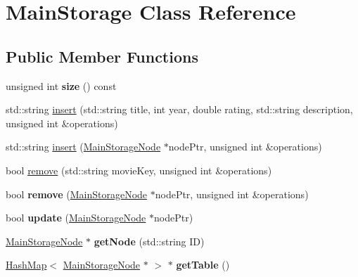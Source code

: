 \hypertarget{class_main_storage}{}\section{Main\+Storage Class Reference}
\label{class_main_storage}
\subsection*{Public Member Functions}
\begin{DoxyCompactItemize}
\item 
\mbox{\label{class_main_storage_a6221cec0fe744dbf127986da7cb31bb3}} 
unsigned int {\bfseries size} () const
\item 
std\+::string \hyperlink{class_main_storage_a96509520e0e92707d8970fb6dbcce111}{insert} (std\+::string title, int year, double rating, std\+::string description, unsigned int \&operations)
\item 
std\+::string \hyperlink{class_main_storage_a68e04c1da39ddb9c295ed9199b845e6d}{insert} (\hyperlink{class_main_storage_node}{Main\+Storage\+Node} $\ast$node\+Ptr, unsigned int \&operations)
\item 
bool \hyperlink{class_main_storage_aa74ada591aaeaddf0adab3f78fa0cbb7}{remove} (std\+::string movie\+Key, unsigned int \&operations)
\item 
\mbox{\label{class_main_storage_a8713c36cd8e943b6df90cb7509858390}} 
bool {\bfseries remove} (\hyperlink{class_main_storage_node}{Main\+Storage\+Node} $\ast$node\+Ptr, unsigned int \&operations)
\item 
\mbox{\label{class_main_storage_a647e7bdd87ee6fa44a6b3d10c87b3231}} 
bool {\bfseries update} (\hyperlink{class_main_storage_node}{Main\+Storage\+Node} $\ast$node\+Ptr)
\item 
\mbox{\label{class_main_storage_a2b4e41b68af000474264b89e37fe2c07}} 
\hyperlink{class_main_storage_node}{Main\+Storage\+Node} $\ast$ {\bfseries get\+Node} (std\+::string ID)
\item 
\mbox{\label{class_main_storage_ada4156df454f7b8183329dfd270be15d}} 
\hyperlink{class_hash_map}{Hash\+Map}$<$ \hyperlink{class_main_storage_node}{Main\+Storage\+Node} $\ast$ $>$ $\ast$ {\bfseries get\+Table} ()

\end{DoxyCompactItemize}
